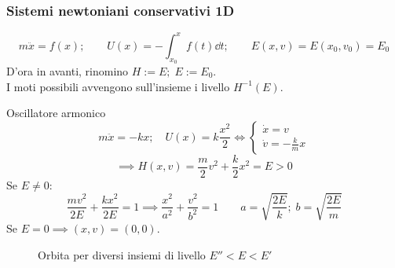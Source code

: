 \subsubsection{Sistemi newtoniani conservativi 1D}
\begin{equation}
    m\ddot{x}= f(x); \qquad U(x)= -\int_{x_0}^{x}f(t)\dd{t}; \qquad E(x,v)=E(x_0,v_0)= E_0
\end{equation}
D'ora in avanti, rinomino $H := E; \; E:=E_0$.\\
I moti possibili avvengono sull'insieme i livello $H^{-1}(E)$.
\begin{example}
    Oscillatore armonico
    \begin{equation}
        m\ddot{x}= -kx; \quad U(x)= k\frac{x^2}{2}
        \iff
        \begin{cases}
            \dot{x}= v\\
            \dot{v}= -\frac{k}{m}x
        \end{cases}
    \end{equation}
    \begin{equation}
        \implies
        H(x,v)= \frac{m}{2}v^2+\frac{k}{2}x^2= E>0
    \end{equation}
    Se $E\neq0$:
    \begin{equation}
        \frac{mv^2}{2E}+\frac{kx^2}{2E}= 1 \implies \frac{x^2}{a^2}+\frac{v^2}{b^2}= 1 \qquad a = \sqrt{\frac{2E}{k}};\; b= \sqrt{\frac{2E}{m}}
    \end{equation}
    Se $E= 0 \implies (x,v)= (0,0)$.

    \begin{figure}[ht]
        \centering
        \caption{Orbita per diversi insiemi di livello $E''<E<E'$}
    \end{figure}

\end{example}

